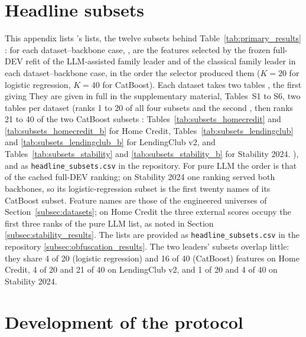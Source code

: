 \documentclass[final,5p,twocolumn]{elsarticle}
\newcommand{\Kfeat}{K}
\providecommand{\DIFaddtex}[1]{{\protect\color{blue} \sf #1}} %
\providecommand{\DIFdeltex}[1]{{\protect\color{red} \scriptsize #1}} %
\providecommand{\DIFaddbegin}{} %
\providecommand{\DIFaddend}{} %
\providecommand{\DIFdelbegin}{} %
\providecommand{\DIFdelend}{} %
\providecommand{\DIFadd}[1]{\texorpdfstring{\DIFaddtex{#1}}{#1}} %
\providecommand{\DIFdel}[1]{\texorpdfstring{\DIFdeltex{#1}}{}} %
\begin{document}
\section{Headline subsets}
\label{app:subsets}
\setcounter{table}{0}\setcounter{figure}{0}

This appendix\DIFdelbegin \DIFdel{lists }\DIFdelend \DIFaddbegin \DIFadd{'s lists, }\DIFaddend the twelve subsets behind Table~\ref{tab:primary_results}\DIFdelbegin \DIFdel{: for each dataset--backbone case, }\DIFdelend \DIFaddbegin \DIFadd{, are }\DIFaddend the features selected by the frozen full-DEV refit of the LLM-assisted family leader and of the classical family leader \DIFaddbegin \DIFadd{in each dataset--backbone case}\DIFaddend , in the order the selector produced them ($\Kfeat=20$ for logistic regression, $\Kfeat=40$ for CatBoost). \DIFdelbegin \DIFdel{Each dataset takes two tables , the first giving }\DIFdelend \DIFaddbegin \DIFadd{They are given in full in the supplementary material, Tables~S1 to S6, two tables per dataset (}\DIFaddend ranks 1 to 20 of all four subsets\DIFdelbegin \DIFdel{and the second }\DIFdelend \DIFaddbegin \DIFadd{, then }\DIFaddend ranks 21 to 40 of the two CatBoost subsets\DIFdelbegin \DIFdel{: Tables~\ref{tab:subsets_homecredit} and \ref{tab:subsets_homecredit_b} for Home Credit, Tables~\ref{tab:subsets_lendingclub} and \ref{tab:subsets_lendingclub_b} for LendingClub v2, and Tables~\ref{tab:subsets_stability} and \ref{tab:subsets_stability_b} for Stability 2024. }\DIFdelend \DIFaddbegin \DIFadd{), and as \texttt{headline\_subsets.csv} in the repository. }\DIFaddend For pure LLM the order is that of the cached full-DEV ranking; on Stability 2024 one ranking served both backbones, so its logistic-regression subset is the first twenty names of its CatBoost subset. Feature names are those of the engineered universes of Section~\ref{subsec:datasets}; on Home Credit the three external scores occupy the first three ranks of the pure LLM list, as noted in Section~\DIFdelbegin \DIFdel{\ref{subsec:stability_results}. The lists are provided as \texttt{headline\_subsets.csv} in the repository}\DIFdelend \DIFaddbegin \DIFadd{\ref{subsec:obfuscation_results}. The two leaders' subsets overlap little: they share 4 of 20 (logistic regression) and 16 of 40 (CatBoost) features on Home Credit, 4 of 20 and 21 of 40 on LendingClub v2, and 1 of 20 and 4 of 40 on Stability 2024.
}

\section{\DIFadd{Development of the protocol}}
\label{app:protocol}
\setcounter{table}{0}\setcounter{figure}{0}
\end{document}
